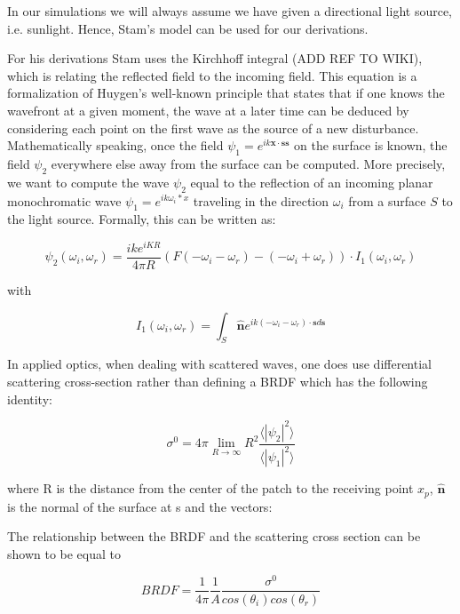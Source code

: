 In our simulations we will always assume we have given a directional light source, i.e. sunlight. Hence, Stam's model can be used for our derivations.

For his derivations Stam uses the Kirchhoff integral (ADD REF TO WIKI), which is relating the reflected field to the incoming field. This equation is a formalization of Huygen’s well-known principle that states that if one knows the wavefront at a given moment, the wave at a later time can be deduced by considering each point on the first wave as the source of a new disturbance. Mathematically speaking, once the field  $\psi_1 =  e^{ik\mathbf{x} \cdot \mathbf{s}\mathbf{s}}$ on the surface is known, the field $\psi_2$ everywhere else away from the surface can be computed.
More precisely, we want to compute the wave $\psi_2$ equal to the reflection of an incoming planar monochromatic wave $\psi_1 = e^{ik \omega_i * x}$  traveling in the direction $\omega_i$ from a surface $S$ to the light source. Formally, this can be written as:

\begin{equation}
\psi_{2}(\omega_i, \omega_r) = \frac{i k e^{i K R}}{4 \pi R} (F(-\omega_i-\omega_r)-(-\omega_i+\omega_r)) \cdot I_{1}(\omega_i, \omega_r) 
\label{eq:kirchhoff}
\end{equation}

with

\begin{equation}
I_{1}(\omega_i, \omega_r) = \int_{S} \hat{\mathbf{n}} e^{ik(-\omega_i-\omega_{r}) \cdot \mathbf{s} d\mathbf{s}}
\label{eq:IBase}
\end{equation}

In applied optics, when dealing with scattered waves, one does use differential scattering cross-section rather than defining a BRDF which has the following identity: 

\begin{equation}
    \sigma^0 = 4 \pi \lim_{R \to \infty} R^2 \frac{\langle \left|\psi_2\right|^2\rangle}{\langle \left|\psi_1\right|^2\rangle}
\end{equation}

where R is the distance from the center of the patch to the receiving point $x_p$, $\hat{\mathbf{n}}$ is the normal of the surface at s and the vectors:

The relationship between the BRDF and the scattering cross section can be shown to be equal to 

\begin{equation}
 BRDF = \frac{1}{4\pi}\frac{1}{A}\frac{\sigma^0}{cos(\theta_i)cos(\theta_r)}
 \label{fig:crossscateringbrdfrelationship} 
\end{equation}

